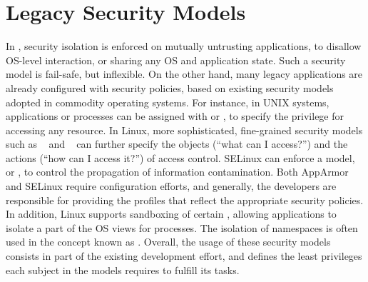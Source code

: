 

\section{Legacy Security Models}
\label{sec:future:security}


In \liboses{}, security isolation is enforced on mutually untrusting applications,
to disallow OS-level interaction,
or sharing any OS and application state.
Such a security model is fail-safe, but inflexible.
On the other hand, many legacy applications are already
configured with security policies,
based on existing security models adopted in commodity operating systems.
For instance, in UNIX systems, applications or processes
can be assigned with  or ,
to specify the privilege for accessing any resource.
In Linux, more sophisticated, fine-grained security models
such as ~\citep{apparmor} and ~\citep{selinux}
can further specify the objects (``what can I access?'')
and the actions (``how can I access it?'') of access control.
SELinux can enforce a  model, or ,
to control the propagation of information contamination.
Both AppArmor and SELinux require configuration efforts,
and generally, the developers are responsible for
providing the profiles
that reflect the appropriate security policies.
In addition,
Linux supports sandboxing of certain ,
allowing applications to isolate a part of the OS views for processes.
The isolation of namespaces is often used in the concept known as .
Overall, the usage of these security models consists in
part of the existing development effort,
and defines the least privileges each subject in the models requires
to fulfill its tasks.


